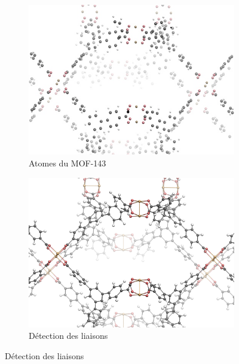 \documentclass[thesis]{subfiles}
\begin{document}
\begin{otherlanguage}{french}
\begin{figure}
	\centering
	\begin{subfigure}{0.5\linewidth}
		\centering
		\includegraphics[width=0.95\linewidth]{figures/topology/mof14_0.jpg}
		\caption{Atomes du MOF-143 \autocite{MOF143}}
	\end{subfigure}%
	\begin{subfigure}{0.5\linewidth}
		\centering
		\includegraphics[width=0.95\linewidth]{figures/topology/mof14_1.jpg}
		\caption{Détection des liaisons}
	\end{subfigure}

\vspace{1em}


\end{figure}
\end{otherlanguage}
\end{document}
